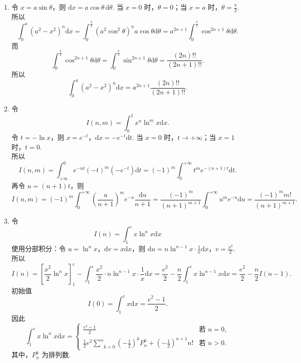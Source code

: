 \begin{enumerate}
\begin{solution}
\begin{enumerate}
        \item[(c)]
        令 $x = a \sin \theta$，则 $\mathrm{d}x = a \cos \theta \,\mathrm{d}\theta$. 当 $x=0$ 时，$\theta=0$；当 $x=a$ 时，$\displaystyle\theta=\frac{\pi}{2}$.\\
        所以
        \[
        \int_{0}^{a} (a^2 - x^2)^n \mathrm{d}x = \int_{0}^{\frac{\pi}{2}} (a^2 \cos^2 \theta)^n a \cos \theta \mathrm{d}\theta = a^{2n+1} \int_{0}^{\frac{\pi}{2}} \cos^{2n+1} \theta \mathrm{d}\theta.
        \]
        而
        \[
        \int_{0}^{\frac{\pi}{2}} \cos^{2n+1} \theta \mathrm{d}\theta = \int_{0}^{\frac{\pi}{2}} \sin^{2n+1} \theta \mathrm{d}\theta = \frac{(2n)!!}{(2n+1)!!}.
        \]
        所以
        \[
        \int_{0}^{a} (a^2 - x^2)^n \mathrm{d}x = a^{2n+1} \frac{(2n)!!}{(2n+1)!!}.
        \]

        \item[(d)]
        令
        \[
        I(n,m) = \int_{0}^{1} x^n \ln^m x \mathrm{d}x.
        \]
        令 $t = -\ln x$，则 $x = e^{-t}$，$\displaystyle\mathrm{d}x = -e^{-t} \mathrm{d}t$. 当 $x=0$ 时，$t \to +\infty$；当 $x=1$ 时，$t=0$.\\
        所以
        \[
        I(n,m) = \int_{+\infty}^{0} e^{-nt} (-t)^m (-e^{-t}) \mathrm{d}t = (-1)^m \int_{0}^{+\infty} t^m e^{-(n+1)t} \mathrm{d}t.
        \]
        再令 $u = (n+1)t$，则
        \[
        I(n,m) = (-1)^m \int_{0}^{+\infty} \left(\frac{u}{n+1}\right)^m e^{-u} \frac{\mathrm{d}u}{n+1} = \frac{(-1)^m}{(n+1)^{m+1}} \int_{0}^{+\infty} u^m e^{-u} \mathrm{d}u = \frac{(-1)^m m!}{(n+1)^{m+1}}.
        \]

        \item[(e)]
        令
        \[
        I(n) = \int_{1}^{e} x \ln^n x \mathrm{d}x
        \]
        使用分部积分：令 $u = \ln^n x$，$\mathrm{d}v = x \mathrm{d}x$，则 $\displaystyle \mathrm{d}u = n \ln^{n-1} x \cdot \frac{1}{x} \mathrm{d}x$，$\displaystyle v = \frac{x^2}{2}$.\\
        所以
        \[
        I(n) = \left[\frac{x^2}{2} \ln^n x\right]_{1}^{e} - \int_{1}^{e} \frac{x^2}{2} \cdot n \ln^{n-1} x \cdot \frac{1}{x} \mathrm{d}x = \frac{e^2}{2} - \frac{n}{2} \int_{1}^{e} x \ln^{n-1} x \mathrm{d}x = \frac{e^2}{2} - \frac{n}{2} I(n-1).
        \]
        初始值
        \[
        I(0) = \int_{1}^{e} x \mathrm{d}x = \frac{e^2 - 1}{2}.
        \]
        因此
        \[
        \int_{1}^{e} x\ln^n{x} \mathrm{d}x = 
        \begin{cases}
        \displaystyle\frac{e^2-1}{2} & \text{若 } n=0, \\
        \displaystyle\frac{1}{2}e^2\underset{k=0}{\overset{n}{\sum}}\left(-\frac{1}{2}\right)^kP_{n}^{k}+\left(-\frac{1}{2}\right)^{n+1}n! & \text{若 } n>0.
        \end{cases}
        \]
        其中，$\displaystyle P_n^k$ 为排列数.
        \end{enumerate}
    \end{solution}


\end{enumerate}
